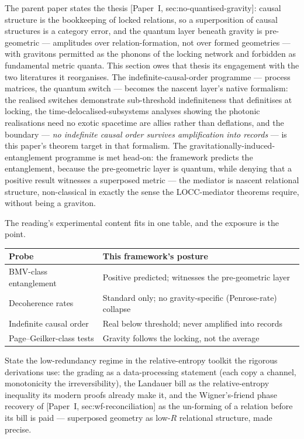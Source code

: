 \documentclass[11pt,a4paper]{article}
\newcommand{\Pone}[1]{[Paper~I, #1]} %
\begin{document}
The parent paper states the thesis \Pone{sec:no-quantised-gravity}: causal structure is the
bookkeeping of locked relations, so a superposition of causal structures is a category error, and
the quantum layer beneath gravity is pre-geometric --- amplitudes over relation-formation, not
over formed geometries --- with gravitons permitted as the phonons of the locking network and
forbidden as fundamental metric quanta. This section owes that thesis its engagement with the two
literatures it reorganises. The indefinite-causal-order programme --- process matrices, the
quantum switch --- becomes the nascent layer's native formalism: the realised switches
\autocite{procopio2015experimental} demonstrate sub-threshold indefiniteness that definitises at
locking, the time-delocalised-subsystems analyses showing the photonic realisations need no exotic
spacetime are allies rather than deflations, and the boundary --- \emph{no indefinite causal order
survives amplification into records} --- is this paper's theorem target in that formalism.
The gravitationally-induced-entanglement programme
\autocite{bose2017spin, marlettovedral2017gravitationally} is met head-on: the framework predicts
the entanglement, because the pre-geometric layer is quantum, while denying that a positive result
witnesses a superposed metric --- the mediator is nascent relational structure, non-classical in
exactly the sense the LOCC-mediator theorems require, without being a graviton.

The reading's experimental content fits in one table, and the exposure is the point.

\begin{center}
\begin{tabular}{ll}
\hline
Probe & This framework's posture \\
\hline
BMV-class entanglement & Positive predicted; witnesses the pre-geometric layer \\
Decoherence rates & Standard only; no gravity-specific (Penrose-rate) collapse \\
Indefinite causal order & Real below threshold; never amplified into records \\
Page--Geilker-class tests & Gravity follows the locking, not the average \\
\hline
\end{tabular}
\end{center}

\begin{openproblem}\label{op:p2-nascent}
State the low-redundancy regime in the relative-entropy toolkit the rigorous derivations use:
the grading as a data-processing statement (each copy a channel, monotonicity the
irreversibility), the Landauer bill as the relative-entropy inequality its modern proofs already
make it, and the Wigner's-friend phase recovery of \Pone{sec:wf-reconciliation} as the un-forming
of a relation before its bill is paid --- superposed geometry as low-$R$ relational structure,
made precise.
\end{openproblem}
\end{document}
